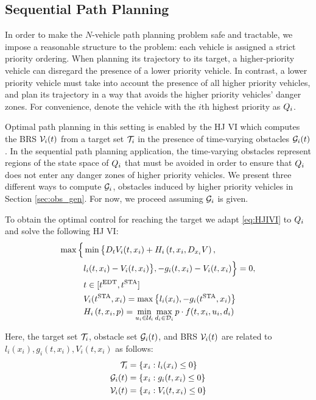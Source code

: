 \subsection{Sequential Path Planning}
In order to make the $N$-vehicle path planning problem safe and tractable, we impose a reasonable structure to the problem: each vehicle is assigned a strict priority ordering. When planning its trajectory to its target, a higher-priority vehicle can disregard the presence of a lower priority vehicle. In contrast, a lower priority vehicle must take into account the presence of all higher priority vehicles, and plan its trajectory in a way that avoids the higher priority vehicles' danger zones. For convenience, denote the vehicle with the $i$th highest priority as $Q_i$.

Optimal path planning in this setting is enabled by the HJ VI which computes the BRS $\mathcal{V}_i(t)$ from a target set $\mathcal{T}_i$ in the presence of time-varying obstacles $\mathcal{G}_i(t)$. In the sequential path planning application, the time-varying obstacles represent regions of the state space of $Q_i$ that must be avoided in order to ensure that $Q_i$ does not enter any danger zones of higher priority vehicles. We present three different ways to compute $\mathcal{G}_i$, obstacles induced by higher priority vehicles in Section \ref{sec:obs_gen}. For now, we proceed assuming $\mathcal{G}_i$ is given.

To obtain the optimal control for reaching the target we adapt \eqref{eq:HJIVI} to $Q_i$ and solve the following HJ VI:
%
\begin{equation}
\label{eq:HJIVI_i}
\begin{aligned}
\max\Big\{&\min\big\{D_t V_i(t, x_i) + H_i\left(t, x_i, D_{x_i} V\right),\\
& l_i(t, x_i) - V_i(t, x_i)\big\}, -g_i(t, x_i) - V_i(t, x_i)\Big\} = 0, \\
& t \in [t^\text{EDT}, t^\text{STA}]\\
&V_i(t^\text{STA}, x_i) = \max\big\{l_i(x_i), -g_i(t^\text{STA}, x_i)\big\} \\
&H_i\left(t, x_i, p\right) = \min_{u_i \in \mathcal{U}_i} \max_{d_i \in \mathcal{D}_i} p \cdot f(t, x_i, u_i, d_i)
\end{aligned}
\end{equation}

Here, the target set $\mathcal{T}_i$, obstacle set $\mathcal{G}_i(t)$, and BRS $\mathcal{V}_i(t)$ are related to $l_i(x_i), g_i(t, x_i), V_i(t, x_i)$ as follows:
%
\begin{equation}
\begin{aligned}
\mathcal{T}_i &= \{x_i: l_i(x_i) \le 0\} \\
\mathcal{G}_i(t) &= \{x_i: g_i(t, x_i) \le 0\} \\
\mathcal{V}_i(t) &= \{x_i: V_i(t, x_i) \le 0\}
\end{aligned}
\end{equation}

